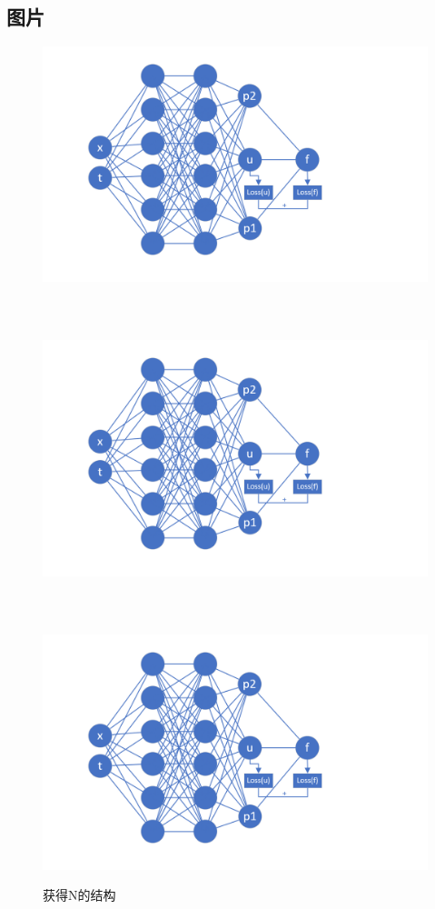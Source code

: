 \subsection{图片}
\begin{frame}
	\begin{figure}[h]
		\includegraphics[width=12cm]{./imags/flower.png}
		\includegraphics[height=10cm]{./imags/flower.png}
		\includegraphics[scale=0.5]{./imags/flower.png}
		\caption{获得N的结构}
	\end{figure}
\end{frame}

